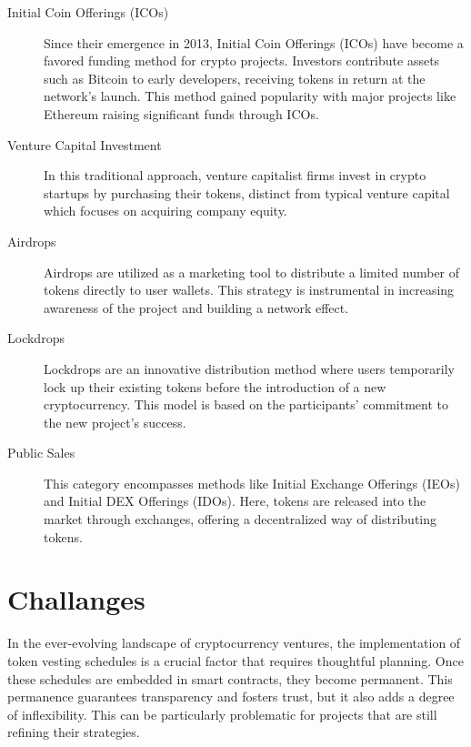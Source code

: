 \documentclass[12pt,oneside]{article}
\begin{document}
\begin{description}
  \item[Initial Coin Offerings (ICOs)]
  Since their emergence in 2013, Initial Coin Offerings (ICOs) have become a favored funding 
  method for crypto projects. Investors contribute assets such as Bitcoin to early developers, 
  receiving tokens in return at the network's launch. This method gained popularity with major projects 
  like Ethereum raising significant funds through ICOs.

  \item[Venture Capital Investment]
  In this traditional approach, venture capitalist firms invest in crypto startups by 
  purchasing their tokens, distinct from typical venture capital which focuses on acquiring company equity.

  \item[Airdrops]
  Airdrops are utilized as a marketing tool to distribute a limited number of 
  tokens directly to user wallets. This strategy is instrumental in increasing awareness 
  of the project and building a network effect.

  \item[Lockdrops]
  Lockdrops are an innovative distribution method where users temporarily lock up their existing 
  tokens before the introduction of a new cryptocurrency. This model is based on the participants' 
  commitment to the new project's success.

  \item[Public Sales]
  This category encompasses methods like Initial Exchange Offerings (IEOs) and Initial DEX Offerings
  (IDOs). Here, tokens are released into the market through exchanges, offering a decentralized way 
  of distributing tokens.
\end{description}


\section{Challanges}

In the ever-evolving landscape of cryptocurrency ventures, the implementation of token vesting schedules is a crucial factor that requires 
thoughtful planning. Once these schedules are embedded in smart contracts, they become permanent. 
This permanence guarantees transparency and fosters trust, but it also adds a degree of inflexibility.
This can be particularly problematic for projects that are still refining their strategies.
\end{document}

